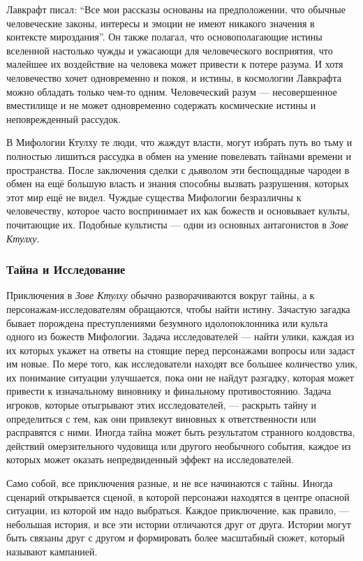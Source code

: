 \documentclass[letterpaper,twocolumn,openany, twoside, 11pt, usenames]{cocbook}
\begin{document}
Лавкрафт писал: ``Все мои рассказы основаны на предположении, что обычные человеческие законы, интересы и эмоции не имеют никакого значения в контексте мироздания''. Он также полагал, что основополагающие истины вселенной настолько чужды и ужасающи для человеческого восприятия, что малейшее их воздействие на человека может привести к потере разума. И хотя человечество хочет одновременно и покоя, и истины, в космологии Лавкрафта можно обладать только чем-то одним. Человеческий разум --- несовершенное вместилище и не может одновременно содержать космические истины и неповрежденный рассудок.

В Мифологии Ктулху те люди, что жаждут власти, могут избрать путь во тьму и полностью лишиться рассудка в обмен на умение повелевать тайнами времени и пространства. После заключения сделки с дьяволом эти беспощадные чародеи в обмен на ещё большую власть и знания способны вызвать разрушения, которых этот мир ещё не видел. Чуждые существа Мифологии безразличны к человечеству, которое часто воспринимает их как божеств и основывает культы, почитающие их. Подобные культисты --- одни из основных антагонистов в {\it Зове Ктулху}.

\subsubsection*{\nohyphens{Тайна и Исследование}}

Приключения в {\it Зове Ктулху} обычно разворачиваются вокруг тайны, а к персонажам-исследователям обращаются, чтобы найти истину. Зачастую загадка бывает порождена преступлениями безумного идолопоклонника или культа одного из божеств Мифологии. Задача исследователей --- найти улики, каждая из их которых укажет на ответы на стоящие перед персонажами вопросы или задаст им новые. По мере того, как исследователи находят все большее количество улик, их понимание ситуации улучшается, пока они не найдут разгадку, которая может привести к изначальному виновнику и финальному противостоянию. Задача игроков, которые отыгрывают этих исследователей, --- раскрыть тайну и определиться с тем, как они привлекут виновных к ответственности или расправятся с ними. Иногда тайна может быть результатом странного колдовства, действий омерзительного чудовища или другого необычного события, каждое из которых может оказать непредвиденный эффект на исследователей.

Само собой, все приключения разные, и не все начинаются с тайны. Иногда сценарий открывается сценой, в которой персонажи находятся в центре опасной ситуации, из которой им надо выбраться. Каждое приключение, как правило, --- небольшая история, и все эти истории отличаются друг от друга. Истории могут быть связаны друг с другом и формировать более масштабный сюжет, который называют кампанией.
\end{document}
